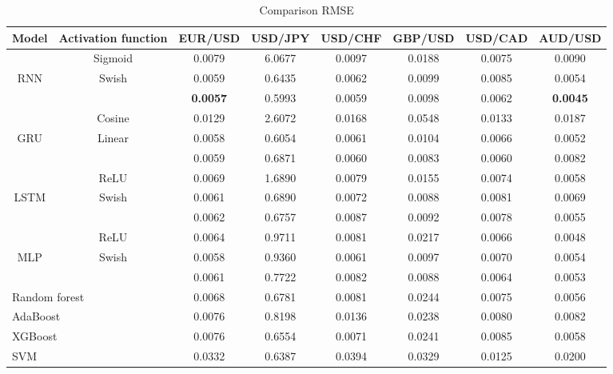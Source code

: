 \documentclass{ieeeaccess}
\begin{document}
\begin{table}[t]
  \caption{Comparison RMSE}
  \small
  \centering
  \begin{tabular*}{0.9\textwidth}{c @{\extracolsep{\fill}} ccccccc}
    \hline
    \textbf{Model} & \textbf{Activation function} & \textbf{EUR/USD} & \textbf{USD/JPY} & \textbf{USD/CHF} & \textbf{GBP/USD} & \textbf{USD/CAD} & \textbf{AUD/USD} \\
    \hline

           & Sigmoid & 0.0079 & 6.0677 & 0.0097 & 0.0188 & 0.0075 & 0.0090 \\
    RNN    & Swish & 0.0059 & 0.6435 & 0.0062 & 0.0099 & 0.0085 & 0.0054 \\
           & \cite{Munkhdalai2019} & \textbf{0.0057} & 0.5993 & 0.0059 & 0.0098 & 0.0062 & \textbf{0.0045} \\

    \hline

           & Cosine & 0.0129 & 2.6072 & 0.0168 & 0.0548 & 0.0133 & 0.0187 \\
    GRU    & Linear & 0.0058 & 0.6054 & 0.0061 & 0.0104 & 0.0066 & 0.0052 \\
           & \cite{Munkhdalai2019} & 0.0059 & 0.6871 & 0.0060 & 0.0083 & 0.0060 & 0.0082 \\

    \hline

           & ReLU & 0.0069 & 1.6890 & 0.0079 & 0.0155 & 0.0074 & 0.0058 \\
    LSTM   & Swish & 0.0061 & 0.6890 & 0.0072 & 0.0088 & 0.0081 & 0.0069 \\
           & \cite{Munkhdalai2019} & 0.0062 & 0.6757 & 0.0087 & 0.0092 & 0.0078 & 0.0055 \\
    
    \hline

           & ReLU & 0.0064 & 0.9711 & 0.0081 & 0.0217 & 0.0066 & 0.0048 \\
    MLP    & Swish & 0.0058 & 0.9360 & 0.0061 & 0.0097 & 0.0070 & 0.0054 \\
           & \cite{Munkhdalai2019} & 0.0061 & 0.7722 & 0.0082 & 0.0088 & 0.0064 & 0.0053 \\

    \hline

    \multicolumn{2}{l}{Random forest} & 0.0068 & 0.6781 & 0.0081 & 0.0244 & 0.0075 & 0.0056 \\
    \multicolumn{2}{l}{AdaBoost} & 0.0076 & 0.8198 & 0.0136 & 0.0238 & 0.0080 & 0.0082 \\
    \multicolumn{2}{l}{XGBoost} & 0.0076 & 0.6554 & 0.0071 & 0.0241 & 0.0085 & 0.0058 \\
    \multicolumn{2}{l}{SVM} & 0.0332 & 0.6387 & 0.0394 & 0.0329 & 0.0125 & 0.0200 \\


\end{tabular*}
\end{table}
\end{document}
